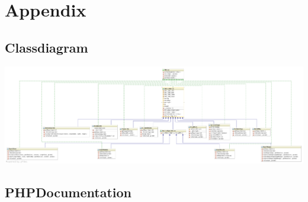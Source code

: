 \section{Appendix}

\begin{landscape}
    \subsection{Classdiagram}

    \includegraphics[width=21cm]{diagram.png}
\end{landscape}

\subsection{PHPDocumentation}